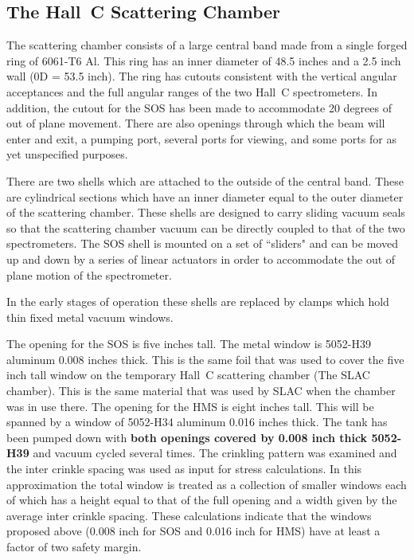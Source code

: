 
\subsection{The Hall~C Scattering Chamber}

The scattering chamber consists of a large central band made from a single
forged ring of 6061-T6 Al. This ring has an inner diameter of
48.5 inches and a  2.5 inch wall (0D = 53.5 inch). The ring has
cutouts consistent with the vertical angular acceptances and the
full angular ranges of the two Hall~C spectrometers. In addition,
the cutout for the SOS has been made to accommodate 20 degrees
of out of plane movement. There are also openings through which the beam
will enter and exit, a pumping port, several ports for viewing, and
some ports for as yet unspecified purposes.

There are two shells which are attached to the outside of the central
band. These are cylindrical sections which have an inner diameter
equal to the outer diameter of the scattering chamber. These shells
are designed to carry sliding vacuum seals so that the scattering
chamber vacuum can be directly coupled to that of the two spectrometers.
The SOS shell is mounted on a set of ``sliders" and can be moved
up and down by a series of linear actuators in order to accommodate the
out of plane motion of the spectrometer.

In the early stages of operation these shells are replaced by
clamps which hold thin fixed metal vacuum windows.

The opening for the SOS is five inches tall. The metal window is
5052-H39 aluminum 0.008 inches thick. This is the same foil that was used to
cover the five inch tall window on the temporary Hall~C scattering chamber
(The SLAC chamber). This is the same material that was used by SLAC when
the chamber was in use there.
The opening for the HMS
is eight inches tall. This will be spanned by a window of
5052-H34 aluminum 0.016 inches thick. The tank has been pumped down with
{\bf both openings covered by 0.008 inch thick 5052-H39 }
and vacuum cycled several
times. The crinkling pattern was examined and the inter crinkle spacing
was used as input for stress calculations. In this approximation the
total window is treated as a collection of smaller windows each of which
has a height equal to that of the full opening and a width given by the average
inter crinkle spacing. These calculations indicate that the windows
proposed above (0.008 inch for SOS and 0.016 inch for HMS) have at least
a factor of two safety margin.

